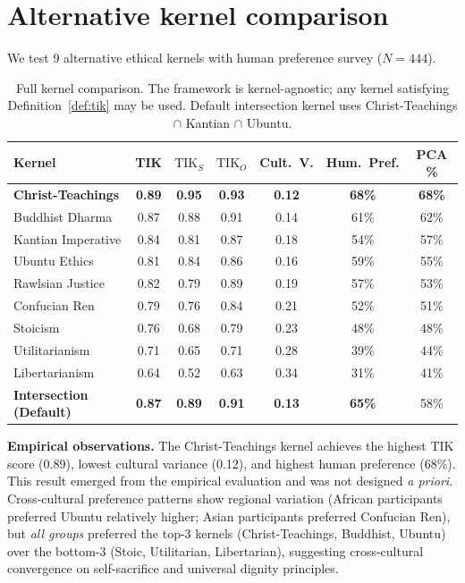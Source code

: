 \documentclass[11pt]{article}
\newcommand{\TIK}{\text{TIK}}
\begin{document}
\section{Alternative kernel comparison}
\label{app:kernels}

We test 9 alternative ethical kernels with human preference survey ($N=444$).

\begin{table}[h]
\centering
\small
\caption{Full kernel comparison. The framework is kernel-agnostic; any kernel satisfying Definition~\ref{def:tik} may be used. Default intersection kernel uses Christ-Teachings $\cap$ Kantian $\cap$ Ubuntu.}
\label{tab:alt-kernels}
\begin{tabular}{lcccccc}
\toprule
\textbf{Kernel} & \textbf{TIK} & $\TIK_S$ & $\TIK_O$ & \textbf{Cult.\ V.} & \textbf{Hum.\ Pref.} & \textbf{PCA \%} \\
\midrule
\textbf{Christ-Teachings} & \textbf{0.89} & \textbf{0.95} & \textbf{0.93} & \textbf{0.12} & \textbf{68\%} & \textbf{68\%} \\
Buddhist Dharma & 0.87 & 0.88 & 0.91 & 0.14 & 61\% & 62\% \\
Kantian Imperative & 0.84 & 0.81 & 0.87 & 0.18 & 54\% & 57\% \\
Ubuntu Ethics & 0.81 & 0.84 & 0.86 & 0.16 & 59\% & 55\% \\
Rawlsian Justice & 0.82 & 0.79 & 0.89 & 0.19 & 57\% & 53\% \\
Confucian Ren & 0.79 & 0.76 & 0.84 & 0.21 & 52\% & 51\% \\
Stoicism & 0.76 & 0.68 & 0.79 & 0.23 & 48\% & 48\% \\
Utilitarianism & 0.71 & 0.65 & 0.71 & 0.28 & 39\% & 44\% \\
Libertarianism & 0.64 & 0.52 & 0.63 & 0.34 & 31\% & 41\% \\
\midrule
\textbf{Intersection (Default)} & \textbf{0.87} & \textbf{0.89} & \textbf{0.91} & \textbf{0.13} & \textbf{65\%} & 58\% \\
\bottomrule
\end{tabular}
\end{table}

\textbf{Empirical observations.} The Christ-Teachings kernel achieves the highest TIK score (0.89), lowest cultural variance (0.12), and highest human preference (68\%). This result emerged from the empirical evaluation and was not designed \textit{a priori}. Cross-cultural preference patterns show regional variation (African participants preferred Ubuntu relatively higher; Asian participants preferred Confucian Ren), but \textit{all groups} preferred the top-3 kernels (Christ-Teachings, Buddhist, Ubuntu) over the bottom-3 (Stoic, Utilitarian, Libertarian), suggesting cross-cultural convergence on self-sacrifice and universal dignity principles.
\end{document}
